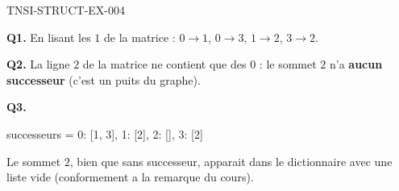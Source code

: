 \begin{corrige}{TNSI-STRUCT-EX-004}

\textbf{Q1.} En lisant les $1$ de la matrice : $0\to1$, $0\to3$, $1\to2$, $3\to2$.

\textbf{Q2.} La ligne $2$ de la matrice ne contient que des $0$ : le sommet $2$ n'a \textbf{aucun successeur} (c'est un puits du graphe).

\textbf{Q3.}
\begin{python}
successeurs = {0: [1, 3], 1: [2], 2: [], 3: [2]}
\end{python}
Le sommet $2$, bien que sans successeur, apparait dans le dictionnaire avec une liste vide (conformement a la remarque du cours).

\end{corrige}
